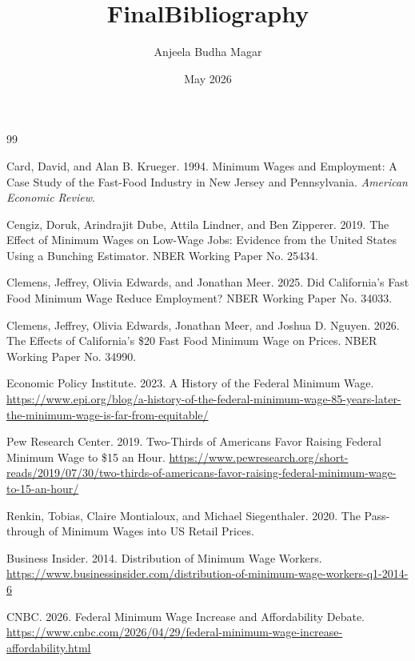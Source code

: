 \documentclass{article}
\title{FinalBibliography}
\author{Anjeela Budha Magar}
\date{May 2026}
\begin{document}
\maketitle


\begin{thebibliography}{99}

Card, David, and Alan B. Krueger. 1994. 
Minimum Wages and Employment: A Case Study of the Fast-Food Industry in New Jersey and Pennsylvania. \textit{American Economic Review}.

Cengiz, Doruk, Arindrajit Dube, Attila Lindner, and Ben Zipperer. 2019. 
The Effect of Minimum Wages on Low-Wage Jobs: Evidence from the United States Using a Bunching Estimator. NBER Working Paper No. 25434.

Clemens, Jeffrey, Olivia Edwards, and Jonathan Meer. 2025. 
Did California’s Fast Food Minimum Wage Reduce Employment? NBER Working Paper No. 34033.

Clemens, Jeffrey, Olivia Edwards, Jonathan Meer, and Joshua D. Nguyen. 2026. 
The Effects of California’s \$20 Fast Food Minimum Wage on Prices. NBER Working Paper No. 34990.

Economic Policy Institute. 2023. 
A History of the Federal Minimum Wage. 
\url{https://www.epi.org/blog/a-history-of-the-federal-minimum-wage-85-years-later-the-minimum-wage-is-far-from-equitable/}

Pew Research Center. 2019. 
Two-Thirds of Americans Favor Raising Federal Minimum Wage to \$15 an Hour. 
\url{https://www.pewresearch.org/short-reads/2019/07/30/two-thirds-of-americans-favor-raising-federal-minimum-wage-to-15-an-hour/}

Renkin, Tobias, Claire Montialoux, and Michael Siegenthaler. 2020. 
The Pass-through of Minimum Wages into US Retail Prices.

Business Insider. 2014. 
Distribution of Minimum Wage Workers. 
\url{https://www.businessinsider.com/distribution-of-minimum-wage-workers-q1-2014-6}

CNBC. 2026. 
Federal Minimum Wage Increase and Affordability Debate. 
\url{https://www.cnbc.com/2026/04/29/federal-minimum-wage-increase-affordability.html}

\end{thebibliography}
\end{document}
